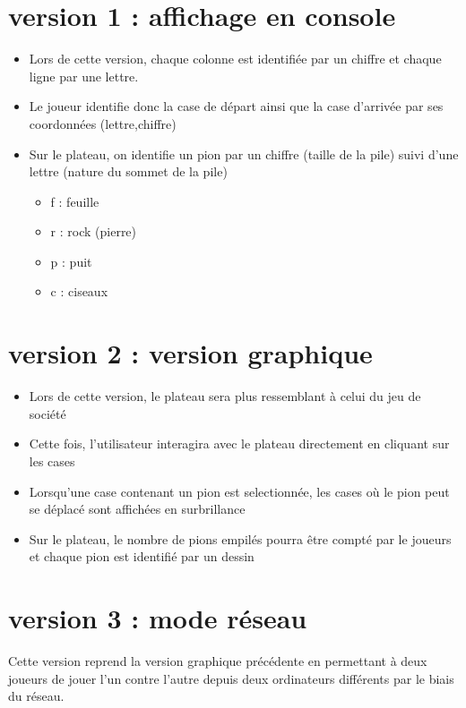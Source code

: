 \documentclass[12pt]{article}
\begin{document}
\section{version 1 : affichage en console}
\begin{itemize}
 \item Lors de cette version, chaque colonne est identifiée par un chiffre et chaque ligne par une lettre.
 \item Le joueur identifie donc la case de départ ainsi que la case d'arrivée par ses coordonnées (lettre,chiffre)
 \item Sur le plateau, on identifie un pion par un chiffre (taille de la pile) suivi d'une lettre (nature du sommet de la pile)
 \begin{itemize}
  \item[\textbullet] f : feuille
  \item[\textbullet] r : rock (pierre)
  \item[\textbullet] p : puit
  \item[\textbullet] c : ciseaux
 \end{itemize}
\end{itemize}
\section{version 2 : version graphique}
\begin{itemize}
 \item Lors de cette version, le plateau sera plus ressemblant à celui du jeu de société
 \item Cette fois, l'utilisateur interagira avec le plateau directement en cliquant sur les cases 
 \item Lorsqu'une case contenant un pion est selectionnée, les cases où le pion peut se déplacé sont affichées en surbrillance
 \item Sur le plateau, le nombre de pions empilés pourra être compté par le joueurs et chaque pion est identifié par un dessin
\end{itemize}

\section{version 3 : mode réseau}

Cette version reprend la version graphique précédente en permettant à deux joueurs de jouer l'un contre l'autre depuis deux ordinateurs différents par le biais du réseau.
 
\end{document}
